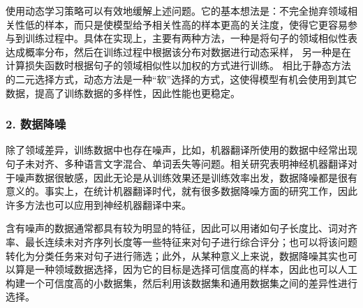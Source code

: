 \parinterval 使用动态学习策略可以有效地缓解上述问题。它的基本想法是：不完全抛弃领域相关性低的样本，而只是使模型给予相关性高的样本更高的关注度，使得它更容易参与到训练过程中。具体在实现上，主要有两种方法，一种是将句子的领域相似性表达成概率分布，然后在训练过程中根据该分布对数据进行动态采样， 另一种是在计算损失函数时根据句子的领域相似性以加权的方式进行训练。 相比于静态方法的二元选择方式，动态方法是一种“软”选择的方式，这使得模型有机会使用到其它数据，提高了训练数据的多样性，因此性能也更稳定。


\subsubsection{2. 数据降噪}

\parinterval 除了领域差异，训练数据中也存在噪声，比如，机器翻译所使用的数据中经常出现句子未对齐、多种语言文字混合、单词丢失等问题。相关研究表明神经机器翻译对于噪声数据很敏感，因此无论是从训练效果还是训练效率出发，数据降噪都是很有意义的。事实上，在统计机器翻译时代，就有很多数据降噪方面的研究工作，因此许多方法也可以应用到神经机器翻译中来。

\parinterval 含有噪声的数据通常都具有较为明显的特征，因此可以用诸如句子长度比、词对齐率、最长连续未对齐序列长度等一些特征来对句子进行综合评分；也可以将该问题转化为分类任务来对句子进行筛选；此外，从某种意义上来说，数据降噪其实也可以算是一种领域数据选择，因为它的目标是选择可信度高的样本，因此也可以人工构建一个可信度高的小数据集，然后利用该数据集和通用数据集之间的差异性进行选择。

